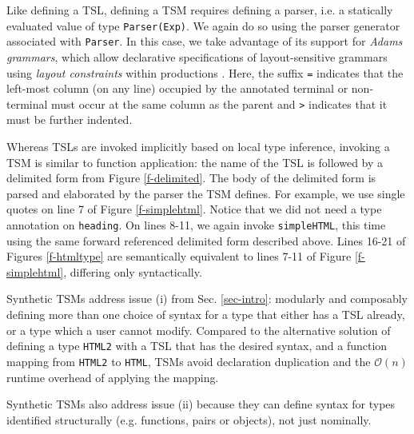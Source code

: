 \documentclass{sig-alternate}[10pt]
\newcommand{\lstinlinew}[1]{\lstinline[style=wyvern]{#1}}
\begin{document}
Like defining a TSL, defining a TSM requires defining a parser, i.e. a statically evaluated value of type \lstinlinew{Parser(Exp)}. We again do so using the parser generator associated with \lstinlinew{Parser}. In this case, we take advantage of its support for \emph{Adams grammars}, which allow declarative specifications of layout-sensitive grammars using \emph{layout constraints} within productions \cite{Adams:2013:PPI:2429069.2429129}. Here, the suffix \lstinlinew{=} indicates that the left-most column (on any line) occupied by the annotated terminal or non-terminal must occur at the same column as the parent  and \lstinlinew{>} indicates that it must be further indented. %

Whereas TSLs are invoked implicitly based on local type inference, invoking a TSM is similar to function application: the name of the TSL is followed by a delimited form from Figure \ref{f-delimited}. The body of the delimited form is parsed and elaborated by the parser the TSM defines. %
For example, we use single quotes on line 7 of Figure \ref{f-simplehtml}. Notice that we did not need a type annotation on \lstinlinew{heading}. %
 On lines 8-11, we again invoke \lstinlinew{simpleHTML}, this time using the same forward referenced delimited form described above. Lines 16-21 of Figures \ref{f-htmltype} are semantically equivalent to lines 7-11 of Figure \ref{f-simplehtml}, differing only syntactically.

 Synthetic TSMs address issue (i) from Sec. \ref{sec-intro}: modularly and composably defining more than one choice of syntax for a type that either has a TSL  already, or a type which a user cannot modify. Compared to the alternative solution of defining a type \lstinlinew{HTML2} with a TSL that has the desired syntax, and a function mapping from \lstinlinew{HTML2} to \lstinlinew{HTML},  TSMs avoid declaration duplication and  the $\mathcal{O}(n)$ runtime overhead of applying the mapping. %

Synthetic TSMs also address issue (ii) because they can define syntax for types identified structurally (e.g. functions, pairs or objects), not just nominally.

\end{document}
